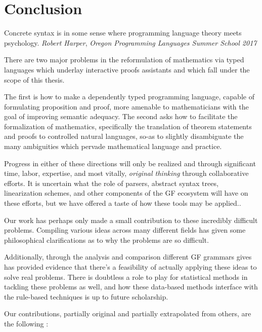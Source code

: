\section{Conclusion}

\begin{displayquote}
Concrete syntax is in some sense where programming language theory meets
psychology. \emph{Robert Harper}, \emph{Oregon Programming Languages Summer School 2017}
\end{displayquote}

There are two major problems in the reformulation of mathematics via typed
languages which underlay interactive proofs assistants and which fall under the
scope of this thesis.

The first is how to make a dependently typed programming language, capable of
formulating proposition and proof, more amenable to mathematicians with the goal
of improving semantic adequacy. The second asks how to facilitate the
formalization of mathematics, specifically the translation of theorem statements
and proofs to controlled natural languages, so-as to slightly disambiguate the
many ambiguities which pervade mathematical language and practice.

Progress in either of these directions will only be realized and through
significant time, labor, expertise, and most vitally, \emph{original thinking}
through collaborative efforts. It is uncertain what the role of parsers,
abstract syntax trees, linearization schemes, and other components of the GF
ecosystem will have on these efforts, but we have offered a taste of how these
tools may be applied..

Our work has perhaps only made a small contribution to these incredibly
difficult problems. Compiling various ideas across many
different fields has given some philosophical clarifications as to why
the problems are so difficult.

Additionally, through the analysis and comparison different GF grammars gives
has provided evidence that there's a feasibility of actually applying these
ideas to solve real problems. There is doubtless a role to play for
statistical methods in tackling these problems as well, and how these data-based
methods interface with the rule-based techniques is up to future scholarship.

Our contributions, partially original and partially extrapolated from others,
are the following :

